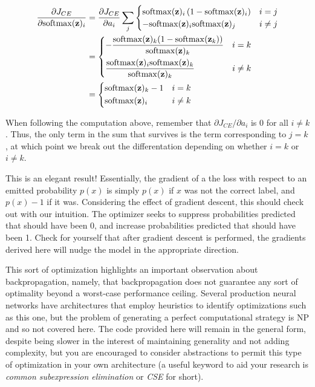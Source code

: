\documentclass[
]{article}
\begin{document}
\[
\begin{aligned}
\frac{\partial J_{CE}}{\partial \mathrm{softmax}(\mathbf{z})_i} &= \frac{\partial J_{CE}}{\partial a_i}\sum_{j} \begin{cases}
\mathrm{softmax}(\mathbf{z})_i\left(1 - \mathrm{softmax}(\mathbf{z})_i\right) & i = j \\
-\mathrm{softmax}(\mathbf{z})_i \mathrm{softmax}(\mathbf{z})_j & i \neq j
\end{cases} \\
&= \begin{dcases}
-\frac{\mathrm{softmax}(\mathbf{z})_k(1 - \mathrm{softmax}(\mathbf{z}_k))}{\mathrm{softmax}(\mathbf{z})_k} & i = k \\
\frac{\mathrm{softmax}(\mathbf{z})_i\mathrm{softmax}(\mathbf{z})_k}{\mathrm{softmax}(\mathbf{z})_k} & i \neq k\\
\end{dcases} \\
&= \begin{dcases}
\mathrm{softmax}(\mathbf{z})_k - 1 & i = k \\
\mathrm{softmax}(\mathbf{z})_i & i \neq k
\end{dcases}
\end{aligned}
\]

When following the computation above, remember that
\(\partial J_{CE} / \partial a_i\) is 0 for all \(i \neq k\). Thus, the
only term in the sum that survives is the term corresponding to
\(j = k\), at which point we break out the differentation depending on
whether \(i = k\) or \(i \neq k\).

This is an elegant result! Essentially, the gradient of a the loss with
respect to an emitted probability \(p(x)\) is simply \(p(x)\) if \(x\)
was not the correct label, and \(p(x) - 1\) if it was. Considering the
effect of gradient descent, this should check out with our intuition.
The optimizer seeks to suppress probabilities predicted that should have
been 0, and increase probabilities predicted that should have been 1.
Check for yourself that after gradient descent is performed, the
gradients derived here will nudge the model in the appropriate
direction.

This sort of optimization highlights an important observation about
backpropagation, namely, that backpropagation does not guarantee any
sort of optimality beyond a worst-case performance ceiling. Several
production neural networks have architectures that employ heuristics to
identify optimizations such as this one, but the problem of generating a
perfect computational strategy is NP and so not covered here. The code
provided here will remain in the general form, despite being slower in
the interest of maintaining generality and not adding complexity, but
you are encouraged to consider abstractions to permit this type of
optimization in your own architecture (a useful keyword to aid your
research is \emph{common subexpression elimination} or \emph{CSE} for
short).
\end{document}
